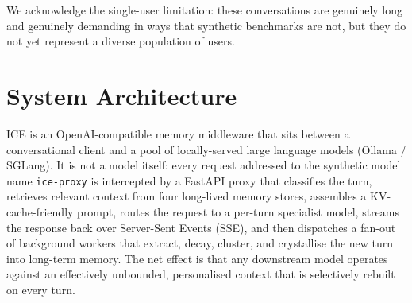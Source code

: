 \documentclass[11pt,a4paper]{article}
\begin{document}
We acknowledge the single-user limitation: these conversations are genuinely long and genuinely demanding in ways that synthetic benchmarks are not, but they do not yet represent a diverse population of users.

\section{System Architecture}
\label{sec:architecture}

ICE is an OpenAI-compatible memory middleware that sits between a conversational client and a pool of locally-served large language models (Ollama / SGLang). It is not a model itself: every request addressed to the synthetic model name \texttt{ice-proxy} is intercepted by a FastAPI proxy that classifies the turn, retrieves relevant context from four long-lived memory stores, assembles a KV-cache-friendly prompt, routes the request to a per-turn specialist model, streams the response back over Server-Sent Events (SSE), and then dispatches a fan-out of background workers that extract, decay, cluster, and crystallise the new turn into long-term memory. The net effect is that any downstream model operates against an effectively unbounded, personalised context that is selectively rebuilt on every turn.
\end{document}
